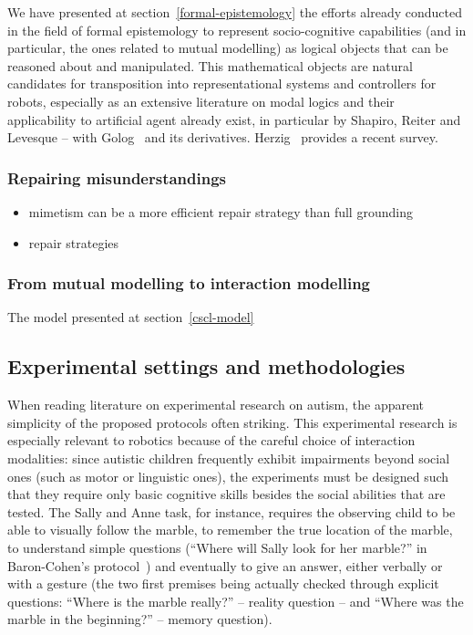 \documentclass{sig-alternate}
\begin{document}
We have presented at section~\ref{formal-epistemology} the efforts already
conducted in the field of formal epistemology to represent socio-cognitive
capabilities (and in particular, the ones related to mutual modelling) as
logical objects that can be reasoned about and manipulated. This mathematical
objects are natural candidates for transposition into representational systems
and controllers for robots, especially as an extensive literature on modal
logics and their applicability to artificial agent already exist, in particular
by Shapiro, Reiter and Levesque -- with Golog~\cite{levesque1997golog} and its
derivatives. Herzig~\cite{herzig2014logics} provides a recent survey.

\subsubsection{Repairing misunderstandings}

\begin{itemize}
    \item mimetism can be a more efficient repair strategy than full grounding
    \item repair strategies
\end{itemize}

\subsubsection{From mutual modelling to interaction modelling}

The model presented at section~\ref{cscl-model}

\subsection{Experimental settings and methodologies}

When reading literature on experimental research on autism, the apparent
simplicity of the proposed protocols often striking. This experimental research
is especially relevant to robotics because of the careful choice of interaction
modalities: since autistic children frequently exhibit impairments beyond social
ones (such as motor or linguistic ones), the experiments must be designed such
that they require only basic cognitive skills besides the social abilities that
are tested. The Sally and Anne task, for instance, requires the observing child
to be able to visually follow the marble, to remember the true location of the
marble, to understand simple questions (``Where will Sally look for her
marble?'' in Baron-Cohen's protocol~\cite{baron1985does}) and eventually to give
an answer, either verbally or with a gesture (the two first premises being
actually checked through explicit questions: ``Where is the
marble really?'' -- reality question -- and ``Where was the marble in the
beginning?'' -- memory question).
\end{document}
